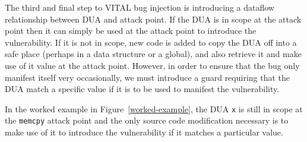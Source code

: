 The third and final step to VITAL bug injection is introducing a dataflow relationship between DUA and attack point.  
If the DUA is in scope at the attack point then it can simply be used at the attack point to introduce the vulnerability.
If it is not in scope, new code is added to copy the DUA off into a safe place (perhaps in a data structure or a global), and also retrieve it and  make use of it value at the attack point. 
However, in order to ensure that the bug only manifest itself very occasionally, we must introduce a guard requiring that the DUA match a specific value if it is to be used to manifest the vulnerability.

In the worked example in Figure~\ref{worked-example}, the DUA \verb+x+ is still in scope at the \verb+memcpy+ attack point and
 the only source code modification necessary is to make use of it to introduce the vulnerability if it matches a particular value.  









